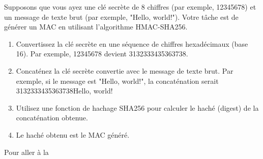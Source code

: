 Supposons que vous ayez une clé secrète de 8 chiffres (par exemple, 12345678) et un message de texte brut (par exemple, "Hello, world!"). Votre tâche est de générer un MAC en utilisant l'algorithme HMAC-SHA256.

\begin{enumerate}
    \item Convertissez la clé secrète en une séquence de chiffres hexadécimaux (base 16). Par exemple, 12345678 devient 3132333435363738.
    
    \item Concaténez la clé secrète convertie avec le message de texte brut. Par exemple, si le message est "Hello, world!", la concaténation serait 3132333435363738Hello, world!

    \item Utilisez une fonction de hachage SHA256 pour calculer le haché (digest) de la concaténation obtenue.

    \item Le haché obtenu est le MAC généré.\\
\end{enumerate}

\par Pour aller à la 
